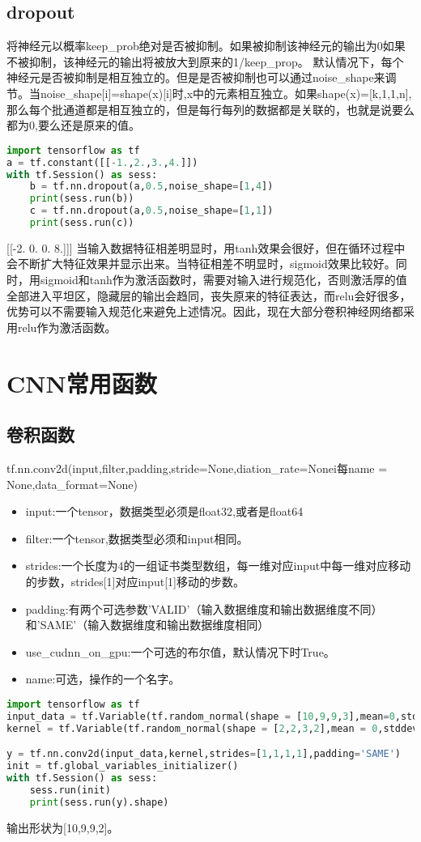 \subsection{dropout}
将神经元以概率keep\_prob绝对是否被抑制。如果被抑制该神经元的输出为0如果不被抑制，该神经元的输出将被放大到原来的1/keep\_prop。
默认情况下，每个神经元是否被抑制是相互独立的。但是是否被抑制也可以通过noise\_shape来调节。当noise\_shape[i]=shape(x)[i]时,x中的元素相互独立。如果shape(x)=[k,1,1,n],那么每个批通道都是相互独立的，但是每行每列的数据都是关联的，也就是说要么都为0,要么还是原来的值。
\begin{lstlisting}[language=Python]
import tensorflow as tf
a = tf.constant([[-1.,2.,3.,4.]])
with tf.Session() as sess:
    b = tf.nn.dropout(a,0.5,noise_shape=[1,4])
    print(sess.run(b))
    c = tf.nn.dropout(a,0.5,noise_shape=[1,1])
    print(sess.run(c))
\end{lstlisting}
[[-2.  0.  0.  8.]]\newline
[[-0.  0.  0.  0.]]\newline
当输入数据特征相差明显时，用tanh效果会很好，但在循环过程中会不断扩大特征效果并显示出来。当特征相差不明显时，sigmoid效果比较好。同时，用sigmoid和tanh作为激活函数时，需要对输入进行规范化，否则激活厚的值全部进入平坦区，隐藏层的输出会趋同，丧失原来的特征表达，而relu会好很多，优势可以不需要输入规范化来避免上述情况。因此，现在大部分卷积神经网络都采用relu作为激活函数。
\section{CNN常用函数}
\subsection{卷积函数}
tf.nn.conv2d(input,filter,padding,stride=None,diation\_rate=Nonei每name = None,data\_format=None)\newline
\begin{itemize}
\item input:一个tensor，数据类型必须是float32,或者是float64
\item filter:一个tensor,数据类型必须和input相同。
\item strides:一个长度为4的一组证书类型数组，每一维对应input中每一维对应移动的步数，strides[1]对应input[1]移动的步数。
\item padding:有两个可选参数'VALID'（输入数据维度和输出数据维度不同）和'SAME'（输入数据维度和输出数据维度相同）
\item use\_cudnn\_on\_gpu:一个可选的布尔值，默认情况下时True。
\item name:可选，操作的一个名字。
\end{itemize}
\begin{lstlisting}[language=Python]
import tensorflow as tf
input_data = tf.Variable(tf.random_normal(shape = [10,9,9,3],mean=0,stddev=1),dtype = tf.float32)
kernel = tf.Variable(tf.random_normal(shape = [2,2,3,2],mean = 0,stddev=1,dtype=tf.float32))

y = tf.nn.conv2d(input_data,kernel,strides=[1,1,1,1],padding='SAME')
init = tf.global_variables_initializer()
with tf.Session() as sess:
    sess.run(init)
    print(sess.run(y).shape)
\end{lstlisting}
输出形状为[10,9,9,2]。
